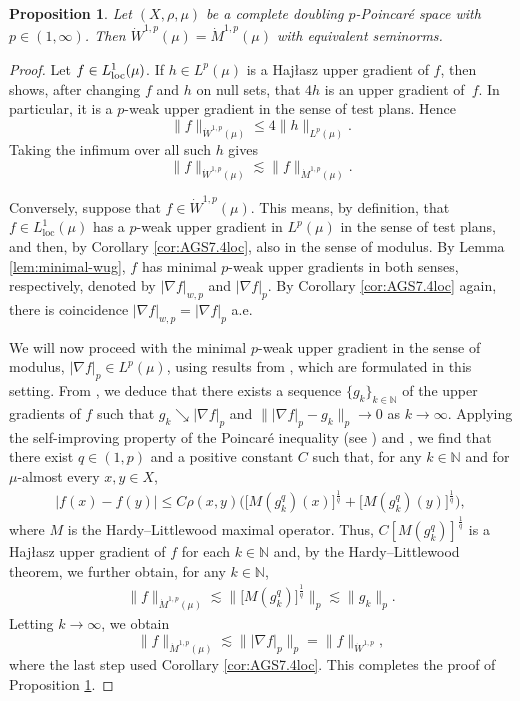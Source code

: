 \documentclass[11pt]{amsart}
\newtheorem{proposition}[theorem]{Proposition}
\theoremstyle{definition}
\theoremstyle{remark}
\numberwithin{equation}{section}
\newcommand{\abs}[1]{|#1|}
\newcommand{\Norm}[2]{\|#1\|_{#2}}
\begin{document}
\begin{proposition}\label{prop:MWE}
Let $(X,\rho,\mu)$ be a complete doubling
$p$-Poincar\'e space with $p\in(1,\infty)$.
Then $\dot{W}^{1,p}(\mu)=\dot{M}^{1,p}(\mu)$ with equivalent seminorms.
\end{proposition}
\begin{proof}
Let $f\in L^1_{\rm loc}(\mu)$. If $h\in L^p(\mu)$ is a Haj\l asz
upper gradient of $f$, then \cite[Theorem 1.3]{JSYY:15} shows, after
changing $f$ and $h$ on null sets, that $4h$ is an upper gradient of~$f$.
In particular, it is a $p$-weak upper gradient in the sense of
test plans. Hence
$$
   \Norm{f}{\dot W^{1,p}(\mu)}
   \leq 4\Norm{h}{L^p(\mu)}.
$$
Taking the infimum over all such $h$ gives
$$
   \Norm{f}{\dot W^{1,p}(\mu)}
   \lesssim\Norm{f}{\dot M^{1,p}(\mu)}.
$$

Conversely, suppose that $f\in\dot W^{1,p}(\mu)$.
This means, by definition, that $f\in L^1_{\mathrm{loc}}(\mu)$ has a $p$-weak upper gradient
in $L^p(\mu)$
in the sense of test plans, and then, by Corollary \ref{cor:AGS7.4loc},
also in the sense of modulus. By Lemma \ref{lem:minimal-wug}, $f$ has minimal
$p$-weak upper gradients in both senses, respectively, denoted by $\abs{\nabla f}_{w,p}$
and $\abs{\nabla f}_p$. By Corollary \ref{cor:AGS7.4loc} again, there is coincidence
$\abs{\nabla f}_{w,p}=\abs{\nabla f}_p$ a.e.

We will now proceed with the minimal $p$-weak upper gradient in the sense of modulus,
$\abs{\nabla f}_p\in L^p(\mu)$, using results from \cite{HKST:book},
which are formulated in this setting.
From \cite[Lemma 6.2.2]{HKST:book}, we deduce that there exists a
sequence $\{g_k\}_{k\in\mathbb{N}}$ of the upper gradients of $f$ such that
$g_k \searrow |\nabla f|_p$ and $\||\nabla f|_p-g_k\|_p\to 0$ as $k\to \infty$.
Applying the self-improving property of
the Poincar\'e inequality (see \cite[Theorem 1.0.1]{KZ:08})
and \cite[Theorem 8.1.7]{HKST:book},
we find that there exist $q\in(1,p)$ and
a positive constant $C$ such that, for any $k\in\mathbb{N}$ and for $\mu$-almost every
$x,y\in X$,
\begin{align*}
|f(x)-f(y)|\le C \rho(x,y)\Big(\big[M(g_k^q)(x) \big]^{\frac1q}+
\big[M(g_k^q)(y) \big]^{\frac1q}\Big),
\end{align*}
where $M$ is the Hardy--Littlewood maximal operator.
Thus, $C[M(g_k^q)]^{\frac1q}$ is a Haj\l asz upper
gradient of $f$ for each $k\in\mathbb{N}$ and, by
the Hardy--Littlewood theorem, we further obtain, for any $k\in\mathbb{N}$,
\begin{align*}
\|f\|_{\dot{M}^{1,p}(\mu)}\lesssim \Big\|\big[M(g_k^q)\big]^{\frac1q}\Big\|_{p}\lesssim
\|g_k\|_{p}.
\end{align*}
Letting $k\to\infty$, we obtain
$$\|f\|_{\dot{M}^{1,p}(\mu)}\lesssim \||\nabla f|_p\|_{p}=
\|f\|_{\dot{W}^{1,p}},$$
where the last step used Corollary \ref{cor:AGS7.4loc}.
This completes the proof of Proposition \ref{prop:MWE}.
\end{proof}
\end{document}
